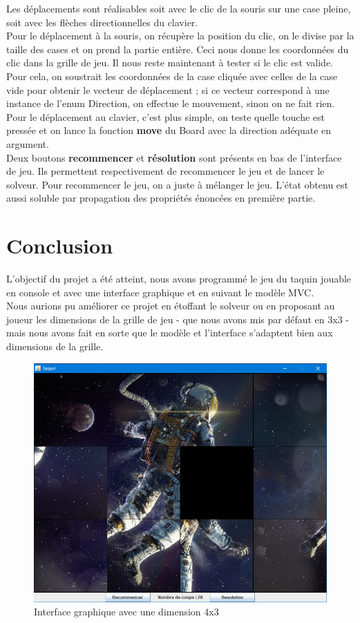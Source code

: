 \documentclass[a4paper,12pt]{article} %
\begin{document}
\newpage

Les déplacements sont réalisables soit avec le clic de la souris sur une case pleine, soit avec les flèches directionnelles du clavier.\\
Pour le déplacement à la souris, on récupère la position du clic, on le divise par la taille des cases et on prend la partie entière. Ceci nous donne les coordonnées du clic dans la grille de jeu. Il nous reste maintenant à tester si le clic est valide. Pour cela, on soustrait les coordonnées de la case cliquée avec celles de la case vide pour obtenir le vecteur de déplacement ; si ce vecteur correspond à une instance de l'enum Direction, on effectue le mouvement, sinon on ne fait rien.\\
Pour le déplacement au clavier, c'est plus simple, on teste quelle touche est pressée et on lance la fonction \textbf{move} du Board avec la direction adéquate en argument.\\

Deux boutons \textbf{recommencer} et \textbf{résolution} sont présents en bas de l'interface de jeu. Ils permettent respectivement de recommencer le jeu et de lancer le solveur. Pour recommencer le jeu, on a juste à mélanger le jeu. L'état obtenu est aussi soluble par propagation des propriétés énoncées en première partie.

\section*{Conclusion}

L'objectif du projet a été atteint, nous avons programmé le jeu du taquin jouable en console et avec une interface graphique et en suivant le modèle MVC.\\

Nous aurions pu améliorer ce projet en étoffant le solveur ou en proposant au joueur les dimensions de la grille de jeu - que nous avons mis par défaut en 3x3 - mais nous avons fait en sorte que le modèle et l'interface s'adaptent bien aux dimensions de la grille.

\newpage

\begin{figure}[!h]
\centering
\includegraphics[scale=0.6]{images/Capture8.PNG}
\caption{Interface graphique avec une dimension 4x3}
\end{figure}
\end{document}
